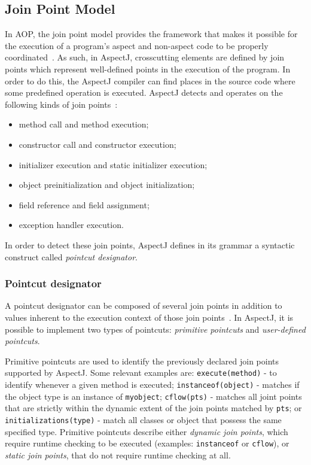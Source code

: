 \documentclass{template}
\begin{document}
\subsection{Join Point Model}

In AOP, the join point model provides the framework that makes it possible for the execution of a program's aspect and non-aspect code to be properly coordinated~\cite{Kiczales97aspect-orientedprogramming}. As such, in AspectJ, crosscutting elements are defined by join points which represent well-defined points in the execution of the program. In order to do this, the AspectJ compiler can find places in the source code where some predefined operation is executed. 
AspectJ detects and operates on the following kinds of join points~\cite{Kiselev2002}: 
\begin{itemize}
\item method call and method execution; 
\item constructor call and constructor execution; 
\item initializer execution and static initializer execution; 
\item object preinitialization and object initialization; 
\item field reference and field assignment; 
\item exception handler execution.
\end{itemize}

In order to detect these join points, AspectJ defines in its grammar a syntactic construct called \textit{pointcut designator}.

\subsubsection{Pointcut designator}

A pointcut designator can be composed of several join points in addition to values inherent to the execution context of those join points~\cite{Kiczales97aspect-orientedprogramming}. In AspectJ, it is possible to implement two types of pointcuts: \textit{primitive pointcuts} and \textit{user-defined pointcuts}.

Primitive pointcuts are used to identify the previously declared join points supported by AspectJ. Some relevant examples are: \texttt{execute(method)} - to identify whenever a given method is executed; \texttt{instanceof(object)} - matches if the object type is an instance of \texttt{myobject};
\texttt{cflow(pts)} - matches all joint points that are strictly within the dynamic extent of the join points matched by \texttt{pts}; or \texttt{initializations(type)} - match all classes or object that possess the same specified type.
Primitive pointcuts describe either \emph{dynamic join points}, which require runtime checking to be executed (examples: \texttt{instanceof} or \texttt{cflow}), or \emph{static join points}, that do not require runtime checking at all.
\end{document}
